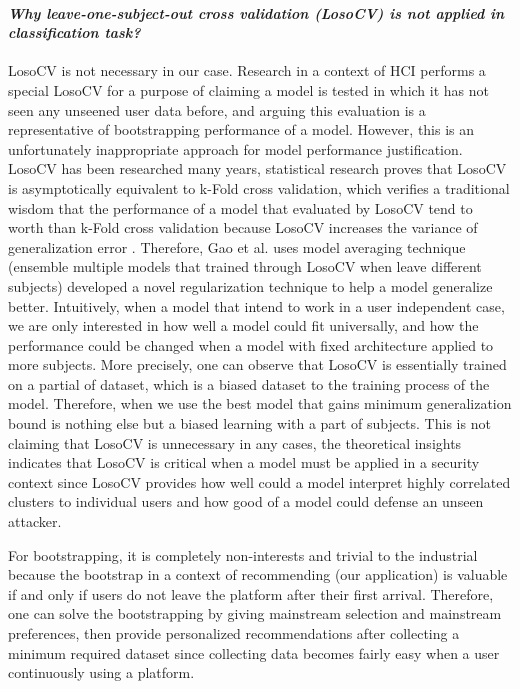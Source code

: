 \paragraph{\emph{Why leave-one-subject-out cross validation (LosoCV) is not applied in classification task?}}

LosoCV is not necessary in our case. Research in a context of HCI performs a special LosoCV
for a purpose of claiming a model is tested in which it has not seen any unseened user data before,
and arguing this evaluation is a representative of bootstrapping performance of a model.
However, this is an unfortunately inappropriate approach for model performance justification.
LosoCV has been researched many years, statistical research \cite{xu2012asymptotic} proves 
that LosoCV is asymptotically equivalent to k-Fold cross validation, which verifies 
a traditional wisdom that the performance of 
a model that evaluated by LosoCV tend to worth than k-Fold cross validation because
LosoCV increases the variance of generalization error \cite{bengio2004no}. Therefore, Gao et al. uses 
model averaging technique (ensemble multiple models that trained through LosoCV when 
leave different subjects) developed a novel regularization technique \cite{gao2016139} 
to help a model generalize better.
Intuitively, when a model that intend to work in a user independent case, 
we are only interested in how well a model could fit universally, 
and how the performance could be changed when a model with fixed architecture applied to more subjects.
More precisely, one can observe that LosoCV is essentially trained on a partial of dataset, 
which is a biased dataset to the training process of the model. Therefore, when we use 
the best model that gains minimum generalization bound is nothing else but a biased learning 
with a part of subjects.
This is not claiming that LosoCV is unnecessary in any cases, the theoretical insights indicates
that LosoCV is critical when a model must be applied in a security context since 
LosoCV provides how well could a model interpret highly correlated clusters 
to individual users and how good of a model could defense an unseen attacker.

For bootstrapping, it is completely non-interests and trivial to the industrial 
because the bootstrap in a context of recommending (our application) is valuable if and only if
users do not leave the platform after their first arrival. Therefore, one can solve
the bootstrapping by giving mainstream selection and mainstream preferences, then provide
personalized recommendations after collecting a minimum required dataset since 
collecting data becomes fairly easy when a user continuously using a platform.

